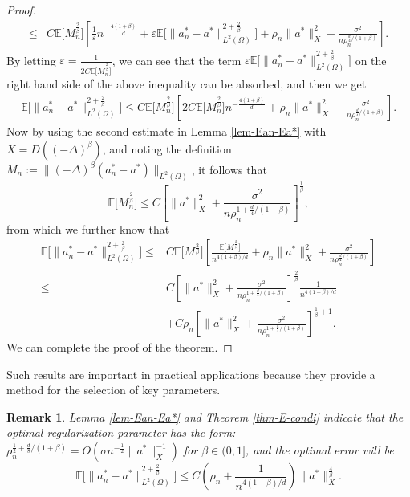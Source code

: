 \documentclass[11pt]{article}
\newtheorem{remark}{Remark}[section]
\numberwithin{equation}{section}
\begin{document}
\begin{proof}
\[\begin{aligned}
\le&  C\mathbb{E} \bigl[M_n^{\frac2\beta} \bigr] \left[ \frac{1}{\varepsilon}n^{-\frac{4(1+\beta)}d}  + \varepsilon \mathbb{E} \bigl[\|a_n^* - a^* \|^{2+\frac2\beta}_{L^2(\Omega)} \bigr] +  \rho_n \| a^* \|^2_{X} +  \frac{\sigma^2}{n \rho_n^{\frac{d}{4}/(1+\beta)}} \right].
\end{aligned}
\]
By letting $\varepsilon=\frac1{2C\mathbb{E} \bigl[M_n^{\frac2\beta} \bigr]}$, we can see that the term  $\varepsilon\mathbb{E} \bigl[\|a_n^* - a^* \|^{2+\frac2\beta}_{L^2(\Omega)} \bigr]$ on the right hand side of the above inequality can be absorbed, and then we get
\[
\begin{aligned}
\mathbb{E} \bigl[ \| a_n^* - a^* \|^{2+\frac{2}{\beta}}_{L^2(\Omega)} \bigr]
\le  C\mathbb{E} \bigl[M_n^{\frac2\beta} \bigr] \left[ 2C\mathbb{E} \bigl[M_n^{\frac2\beta} \bigr] n^{-\frac{4(1+\beta)}d}  +  \rho_n \| a^* \|^2_{X} +  \frac{\sigma^2}{n \rho_n^{\frac{d}{4}/(1+\beta)}} \right].
\end{aligned}
\]
Now by using the second estimate in Lemma \ref{lem-Ean-Ea*} with $X=D((-\Delta)^\beta)$, and noting the definition $M_n:=\|(-\Delta)^\beta (a_n^* - a^*)\|_{L^2(\Omega)}$, it follows that
$$
\mathbb{E} \bigl[M_n^{\frac2\beta} \bigr] \le C\left[ \| a^* \|^2_{X} + \frac{\sigma^2}{n \rho_n^{1 + \frac{d}4/(1+\beta)}}\right]^{\frac1\beta},
$$
from which we further know that
\[
\begin{aligned}
\mathbb{E} \bigl[ \| a_n^* - a^* \|^{2+\frac{2}{\beta}}_{L^2(\Omega)} \bigr]
\le&  C\mathbb{E} \bigl[M^{\frac2\beta} \bigr] \left[ \frac{\mathbb{E} \bigl[M^{\frac2\beta} \bigr]}{n^{4(1+\beta)/d}}  +  \rho_n \| a^* \|^2_{X} +  \frac{\sigma^2}{n \rho_n^{\frac{d}{4}/(1+\beta)}} \right]\\
\le & C\left[ \| a^* \|^2_{X} + \frac{\sigma^2}{n \rho_n^{1 + \frac{d}4/(1+\beta)}}\right]^{\frac2\beta} \frac1{n^{4(1+\beta)/d}} \\
&+ C\rho_n\left[ \| a^* \|^2_{X} + \frac{\sigma^2}{n \rho_n^{1 + \frac{d}4/(1+\beta)}}\right]^{\frac1\beta+1}.
\end{aligned}
\]
We can complete the proof of the theorem.
\end{proof}
Such results are important in practical applications because they provide a method for the selection of key parameters.
\begin{remark}\label{remark-1}
Lemma \ref{lem-Ean-Ea*} and Theorem \ref{thm-E-condi} indicate that the optimal regularization parameter has the form: $\rho_n^{\frac12 + \frac{d}8/(1+\beta)} = O(\sigma n^{-\frac12} \|a^*\|^{-1}_{X})$ for $\beta\in(0,1]$, and the optimal error will be
\[
\mathbb{E} \bigl[ \| a_n^* - a^* \|^{2+\frac2\beta}_{L^2(\Omega)} \bigr]\le C \left(\rho_n+ \frac1{n^{4(1+\beta)/d}} \right) \| a^* \|^{\frac4\beta}_{X}.
\]
\end{remark}
\end{document}
